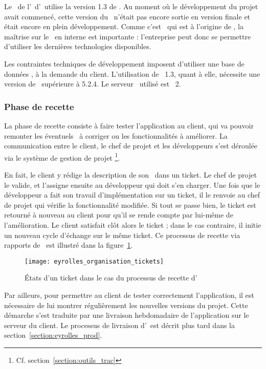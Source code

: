 Le \alotdeux\ de l'\aintranet\ d'\aey\ utilise la version 1.3 de \asf. Au moment où le développement du projet avait commencé, cette version du \afm\ n'était pas encore sortie en version finale et était encore en plein développement. Comme c'est \asl\ qui est à l'origine de \asf, la maîtrise sur le \afm\ en interne est importante : l'entreprise peut donc se permettre d'utiliser les dernières technologies disponibles.

Les contraintes techniques de développement imposent d'utiliser une base de données \apsql, à la demande du client. L'utilisation de \asf\ 1.3, quant à elle, nécessite une version de \aphp\ supérieure à 5.2.4. Le serveur \ahttp\ utilisé est \aapache~2.


\subsubsection{Phase de recette}
\label{section:eyrolles_organisation_recette}

La phase de recette consiste à faire tester l'application au client, qui va pouvoir remonter les éventuels \abugs\ à corriger ou les fonctionnalités à améliorer. La communication entre le client, le chef de projet et les développeurs s'est déroulée via le système de gestion de projet \atrac\footnote{Cf. section~\ref{section:outils_trac}}.

En fait, le client y rédige la description de son \abug\ dans un ticket. Le chef de projet le valide, et l'assigne ensuite au développeur qui doit s'en charger. Une fois que le développeur a fait son travail d'implémentation sur un ticket, il le renvoie au chef de projet qui vérifie la fonctionnalité modifiée. Si tout se passe bien, le ticket est retourné à nouveau au client pour qu'il se rende compte par lui-même de l'amélioration. Le client satisfait clôt alors le ticket ; dans le cas contraire, il initie un nouveau cycle d'échange sur le même ticket. Ce processus de recette via rapports de \abugs\ est illustré dans la figure~\ref{figure:eyrolles_organisation_tickets}.

\begin{figure}
	\centering
	\texttt{[image: eyrolles\_organisation\_tickets]}
	\caption{États d'un ticket dans le cas du processus de recette d'\aey}
	\label{figure:eyrolles_organisation_tickets}
\end{figure}

Par ailleurs, pour permettre au client de tester correctement l'application, il est nécessaire de lui montrer régulièrement les nouvelles versions du projet. Cette démarche s'est traduite par une livraison hebdomadaire de l'application sur le serveur du client. Le processus de livraison d'\aey\ est décrit plus tard dans la section~\ref{section:eyrolles_prod}.


